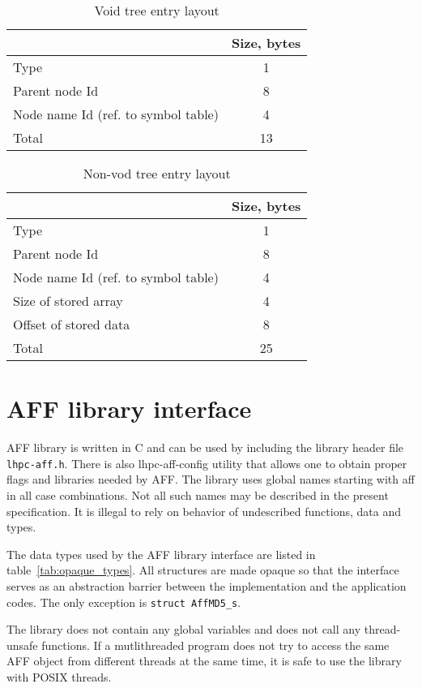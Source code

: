 \documentclass[10pt,letterpaper]{article}
\newcommand{\bc}{\begin{center}}
\newcommand{\ec}{\end{center}}
\newcommand{\ctext}[1]{\texttt{#1}}         %
\newcommand{\ctype}[1]{\ctext{#1}}          %
\begin{document}
\begin{table}[h]
\bc
\caption{Void tree entry layout}
\label{tab:void}
\begin{tabular}{|l|c|} \hline
 & Size, bytes \\ \hline\hline
Type & 1 \\ \hline
Parent node Id & 8 \\ \hline
Node name Id (ref. to symbol table) & 4 \\ \hline
Total & 13 \\ \hline
\end{tabular}
\ec
\end{table}

\begin{table}[h]
\bc
\caption{Non-vod tree entry layout}
\label{tab:tree_entry}
\begin{tabular}{|l|c|} \hline
 & Size, bytes \\ \hline\hline
Type & 1 \\ \hline
Parent node Id & 8 \\ \hline
Node name Id (ref. to symbol table) & 4 \\ \hline
Size of stored array & 4 \\ \hline
Offset of stored data & 8 \\ \hline
Total & 25 \\ \hline
\end{tabular}
\ec
\end{table}


\section{AFF library interface}
AFF library is written in C and can be used by including the library header file \verb|lhpc-aff.h|.
There is also lhpc-aff-config utility that allows one to obtain proper flags 
and libraries needed by AFF.
The library uses global names starting with aff in all case combinations. 
Not all such names may be described in the present specification.
It is illegal to rely on behavior of undescribed functions, data and types.

The data types used by the AFF library interface are listed in
table~\ref{tab:opaque_types}. All structures are made opaque so that
the interface serves as an abstraction barrier between the
implementation and the application codes. The only exception is
\ctype{struct AffMD5\_s}.

The library does not contain any global variables and does not call any thread-unsafe functions. If a
mutlithreaded program does not try to access the same AFF object from different threads at the same
time, it is safe to use the library with POSIX threads.
\end{document}

